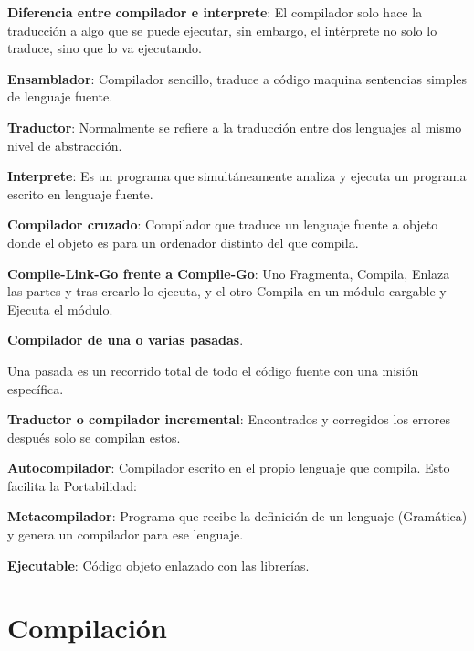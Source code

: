 \documentclass[12pt]{report} %
\begin{document}
\textbf{Diferencia entre compilador e interprete}: El compilador solo
hace la traducción a algo que se puede ejecutar, sin embargo, el
intérprete no solo lo traduce, sino que lo va ejecutando.

\textbf{Ensamblador}: Compilador sencillo, traduce a código maquina
sentencias simples de lenguaje fuente.

\textbf{Traductor}: Normalmente se refiere a la traducción entre dos
lenguajes al mismo nivel de abstracción.

\textbf{Interprete}: Es un programa que simultáneamente analiza y
ejecuta un programa escrito en lenguaje fuente.

\textbf{Compilador cruzado}: Compilador que traduce un lenguaje fuente a
objeto donde el objeto es para un ordenador distinto del que compila.

\textbf{Compile-Link-Go frente a Compile-Go}: Uno Fragmenta, Compila,
Enlaza las partes y tras crearlo lo ejecuta, y el otro Compila en un
módulo cargable y Ejecuta el módulo.

\textbf{Compilador de una o varias pasadas}.

Una pasada es un recorrido total de todo el código fuente con una misión
específica.

\textbf{Traductor o compilador incremental}: Encontrados y corregidos
los errores después solo se compilan estos.

\textbf{Autocompilador}: Compilador escrito en el propio lenguaje que
compila. Esto facilita la Portabilidad:

\textbf{Metacompilador}: Programa que recibe la definición de un
lenguaje (Gramática) y genera un compilador para ese lenguaje.

\textbf{Ejecutable}: Código objeto enlazado con las librerías.


\section{Compilación}
\end{document}
